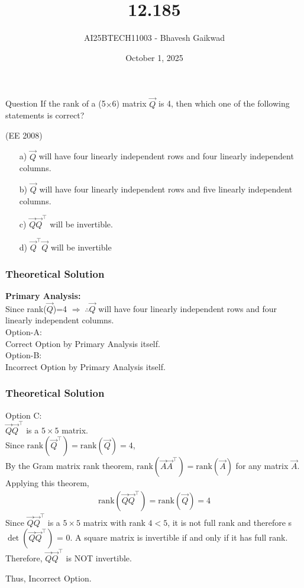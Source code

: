 \documentclass{beamer}
\title
{12.185}
\date{October 1, 2025}
\author 
{AI25BTECH11003 - Bhavesh Gaikwad}
\begin{document}
\frame{\titlepage}
\begin{frame}{Question}
If the rank of a (5$\times$6) matrix $\vec{Q}$ is 4, then which one of the following statements is correct?

\hfill{(EE 2008)}

\begin{itemize}
    \item[a)]$\vec{Q}$ will have four linearly independent rows and four linearly independent columns.
    \item[b)]$\vec{Q}$ will have four linearly independent rows and five linearly independent columns.
    \item[c)]$\vec{Q}\vec{Q}^\top$ will be invertible.
    \item[d)]$\vec{Q}^\top\vec{Q}$ will be invertible 
\end{itemize}

\end{frame}


\begin{frame}[fragile]
    \frametitle{Theoretical Solution}
\textbf{Primary Analysis:}\\
Since rank($\vec{Q}$)=4 $\Rightarrow \; \therefore \vec{Q}$ will have four linearly independent rows and four linearly independent columns.\\

Option-A:\\
Correct Option by Primary Analysis itself.\\

Option-B:\\
Incorrect Option by Primary Analysis itself.\\
\end{frame}


\begin{frame}[fragile]
    \frametitle{Theoretical Solution}
Option C:\\
$\vec{Q}\vec{Q}^\top$ is a $5 \times 5$ matrix.\\
Since $\text{rank}(\vec{Q}^\top) = \text{rank}(\vec{Q}) = 4$,\\
By the Gram matrix rank theorem, $\text{rank}(\vec{A}\vec{A}^\top) = \text{rank}(\vec{A})$ for any matrix $\vec{A}$.\\
Applying this theorem,
\begin{align}
\text{rank}(\vec{Q}\vec{Q}^\top) = \text{rank}(\vec{Q}) = 4
\end{align}
Since $\vec{Q}\vec{Q}^\top$ is a $5 \times 5$ matrix with rank $4 < 5$, it is not full rank and therefore s$\det{(\vec{Q}\vec{Q}^\top)}$ = 0. A square matrix is invertible if and only if it has full rank. Therefore, $\vec{Q}\vec{Q}^\top$ is NOT invertible.

Thus, Incorrect Option.\\
\end{frame}
\end{document}
